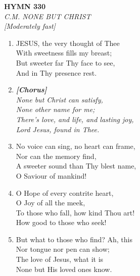 \documentclass[11pt,a4paper]{article}
\begin{document}
\newpage
\begin{center}
    {\Large \textbf{HYMN 330}}
    \\
    \textit{C.M. NONE BUT CHRIST}
    \\
    \textit{\small [Moderately fast]}
\end{center}
\vspace{1em}

\begin{enumerate}
    \item JESUS, the very thought of Thee \\
        With sweetness fills my breast; \\
        But sweeter far Thy face to see, \\
        And in Thy presence rest.

    \item[] \vspace{0.4em}
    \textbf{\textit{[Chorus]}} \\
    \textit{None but Christ can satisfy,} \\
    \textit{None other name for me;} \\
    \textit{There's love, and life, and lasting joy,} \\
    \textit{Lord Jesus, found in Thee.}
    \vspace{0.4em}

    \item No voice can sing, no heart can frame, \\
        Nor can the memory find, \\
        A sweeter sound than Thy blest name, \\
        O Saviour of mankind!

    \item O Hope of every contrite heart, \\
        O Joy of all the meek, \\
        To those who fall, how kind Thou art! \\
        How good to those who seek!

    \item But what to those who find? Ah, this \\
        Nor tongue nor pen can show; \\
        The love of Jesus, what it is \\
        None but His loved ones know.

\end{enumerate}
\end{document}
